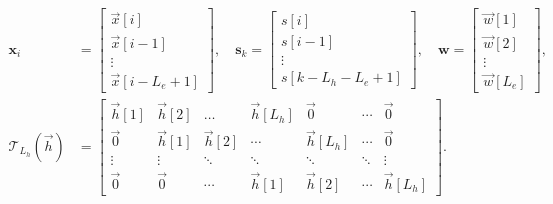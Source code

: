 \begin{align}
\bm{x}_i&=\begin{bmatrix}\vec{x}[i]\\ \vec{x}[i-1]\\ \vdots\\ \vec{x}[i-L_e+1]\end{bmatrix},\quad \bm{s}_k = \begin{bmatrix}s[i]\\ s[i-1]\\ \vdots\\ s[k-L_h-L_e+1]\end{bmatrix},\quad \bm{w}=\begin{bmatrix}\vec{w}[1]\\\vec{w}[2]\\ \vdots\\ \vec{w}[L_e]\end{bmatrix},\\
\mathcal{T}_{L_h}(\vec{h})&=\begin{bmatrix}
\vec{h}[1] & \vec{h}[2] & \ldots     & \vec{h}[L_h] & \vec{0}      & \cdots & \vec{0} \\
\vec{0}    & \vec{h}[1] & \vec{h}[2] & \cdots       & \vec{h}[L_h] & \cdots & \vec{0} \\
\vdots     & \vdots     & \ddots     & \ddots       & \ddots       & \ddots & \vdots  \\
\vec{0}    & \vec{0}    & \cdots     & \vec{h}[1]   & \vec{h}[2]   & \cdots & \vec{h}[L_h]
\end{bmatrix}. \label{eqn:signalmodeldesc_simo}
\end{align}

